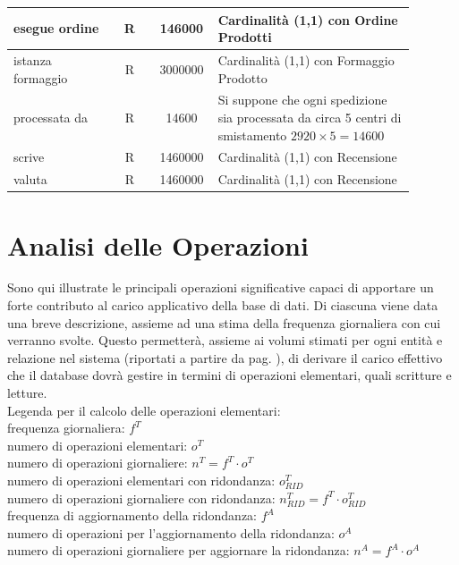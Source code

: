 \documentclass[12pt,a4paper]{article}
\begin{document}
\begin{center}
\begin{longtable}{|p{0.23\linewidth}|p{0.1\linewidth}|p{0.11\linewidth}|p{0.45\linewidth}|}
\hline
esegue ordine
 & 
\multicolumn{1}{|c|}{R}
 & 
\multicolumn{1}{|c|}{146000}
 & 
Cardinalità (1,1) con Ordine Prodotti
\\

\hline
istanza formaggio
 & 
\multicolumn{1}{|c|}{R}
 & 
\multicolumn{1}{|c|}{3000000}
 & 
Cardinalità (1,1) con Formaggio Prodotto
\\

\hline
processata da
 & 
\multicolumn{1}{|c|}{R}
 & 
\multicolumn{1}{|c|}{14600}
 & 
Si suppone che ogni spedizione sia processata da circa 5 centri di smistamento $2920\times 5=14600$
\\

\hline
scrive
 & 
\multicolumn{1}{|c|}{R}
 & 
\multicolumn{1}{|c|}{1460000}
 & 
Cardinalità (1,1) con Recensione
\\

\hline
valuta
 & 
\multicolumn{1}{|c|}{R}
 & 
\multicolumn{1}{|c|}{1460000}
 & 
\vspace{-25pt}Cardinalità (1,1) con Recensione
\\

\hline

\end{longtable}\end{center}

\newpage
\section{Analisi delle Operazioni}
\label{sec:operazioni}
Sono qui illustrate le principali operazioni significative capaci di apportare un forte contributo al carico applicativo della base di dati.
Di ciascuna viene data una breve descrizione, assieme ad una stima della frequenza giornaliera con cui verranno svolte.
Questo permetterà, assieme ai volumi stimati per ogni entità e relazione nel sistema (riportati a partire da pag. \pageref{sec:volumi}), di derivare il carico effettivo che il database dovrà gestire in termini di operazioni elementari, quali scritture e letture.
\\

Legenda per il calcolo delle operazioni elementari:
\\
frequenza giornaliera: $f^T$\\ 
numero di operazioni elementari: $o^T$\\ 
numero di operazioni giornaliere: $n^T = f^T\cdot o^T$\\
numero di operazioni elementari con ridondanza: $o^T_{RID}$\\
numero di operazioni giornaliere con ridondanza: $n^T_{RID}=f^T\cdot o^T_{RID}$\\
frequenza di aggiornamento della ridondanza: $f^A$\\
numero di operazioni per l'aggiornamento della ridondanza: $o^A$\\
numero di operazioni giornaliere per aggiornare la ridondanza: $n^A = f^A\cdot o^A$
\end{document}
